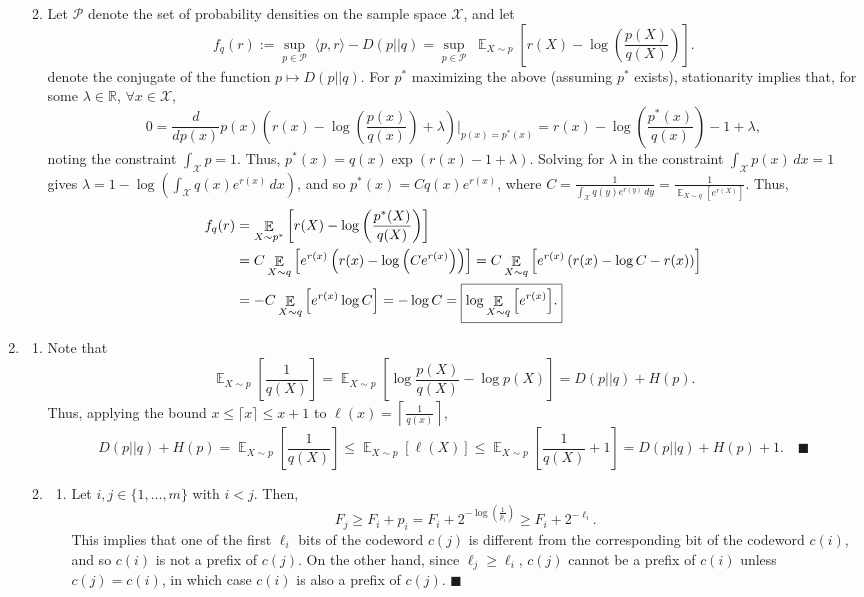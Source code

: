 \documentclass[11pt]{article}
\renewcommand{\qed}{\quad \ensuremath{\blacksquare}}
\newcommand{\E}{\mathop{\mathbb{E}}} %
\newcommand{\R}{\mathbb{R}} %
\newcommand{\Pds}{\mathcal{P}}
\newcommand{\X}{\mathcal{X}}
\begin{document}
\begin{enumerate}
\begin{enumerate}
\newpage
\item Let $\Pds$ denote the set of probability densities on the sample space
$\X$, and let
\[f_q(r)
    := \sup_{p \in \Pds} \; \langle p, r \rangle - D(p || q)
    = \sup_{p \in \Pds} \; \E_{X \sim p}\left[
                        r(X) - \log\left( \frac{p(X)}{q(X)} \right)
        \right].\]
denote the conjugate of the function $p \mapsto D(p || q)$. For $p^*$
maximizing the above (assuming $p^*$ exists), stationarity implies that, for
some $\lambda \in \R$, $\forall x \in \X$,
\[0 = \frac{d}{dp(x)} p(x) \left( r(x) - \log \left( \frac{p(x)}{q(x)} \right)
        + \lambda \right) \bigg|_{p(x) = p^*(x)}
    = r(x) - \log \left( \frac{p^*(x)}{q(x)} \right) - 1 + \lambda,
\]
noting the constraint $\int_\X p = 1$.
Thus, $p^*(x) = q(x) \exp\left( r(x) - 1 + \lambda \right)$. Solving for
$\lambda$ in the constraint $\int_\X p(x) \, dx = 1$ gives
$\lambda = 1 - \log \left( \int_\X q(x) e^{r(x)} \, dx \right)$, and so
$p^*(x) = C q(x)e^{r(x)}$, where
$C = \frac{1}{\int_\X q(y) e^{r(y)} \, dy}
    = \frac{1}{\E_{X \sim q}\left[ e^{r(X)} \right]}$.
Thus,
\begin{align*}
f_q(r)
 &  = \E_{X \sim p^*} \left[ r(X) - \log \left( \frac{p^*(X)}{q(X)} \right) \right] \\
 &  = C \E_{X \sim q} \left[ e^{r(x)} \left( r(x) - \log \left( C e^{r(x)} \right) \right) \right]
    = C \E_{X \sim q} \left[ e^{r(x)} \left( r(x) - \log C - r(x) \right) \right]    \\
 &  = -C \E_{X \sim q} \left[ e^{r(x)} \log C \right]
    = - \log C
    = \mbox{\fbox{$ \displaystyle \log \E_{X \sim q} \left[ e^{r(x)} \right]$.}}
\end{align*}

\end{enumerate}

\item
\begin{enumerate}
\item Note that
\[\E_{X \sim p}\left[ \frac{1}{q(X)} \right]
    = \E_{X \sim p}\left[ \log \frac{p(X)}{q(X)} - \log p(X) \right]
    = D(p||q) + H(p).
\]
Thus, applying the bound $x \leq \lceil x \rceil \leq x + 1$ to
$\ell(x) = \left\lceil \frac{1}{q(x)} \right\rceil$,
\[D(p||q) + H(p)
    = \E_{X \sim p}\left[ \frac{1}{q(X)} \right]
    \leq \E_{X \sim p}\left[ \ell(X) \right]
    \leq \E_{X \sim p}\left[ \frac{1}{q(X)} + 1 \right]
    = D(p||q) + H(p) + 1. \qed
\]

\item
\begin{enumerate}
\item Let $i,j \in \{1,\dots,m\}$ with $i < j$. Then,
\[F_j
    \geq F_i + p_i
    = F_i + 2^{-\log \left( \frac{1}{p_i} \right)}
    \geq F_i + 2^{-\ell_i}.\]
This implies that one of the first $\ell_i$ bits of the codeword $c(j)$ is
different from the corresponding bit of the codeword $c(i)$, and so $c(i)$ is
not a prefix of $c(j)$. On the other hand, since $\ell_j \geq \ell_i$, $c(j)$
cannot be a prefix of $c(i)$ unless $c(j) = c(i)$, in which case $c(i)$ is also
a prefix of $c(j)$. \qed


\end{enumerate}
\end{enumerate}
\end{enumerate}
\end{document}
